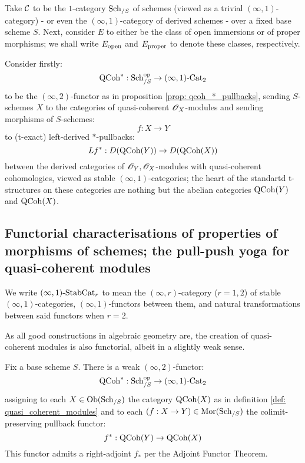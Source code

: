         \begin{example}
            Take $\mathcal{C}$ to be the $1$-category $\mathrm{Sch}_{/S}$ of schemes (viewed as a trivial $(\infty, 1)$-category) - or even the $(\infty, 1)$-category of derived schemes - over a fixed base scheme $S$. Next, consider $E$ to either be the class of open immersions or of proper morphisms; we shall write $E_{\mathrm{open}}$ and $E_{\mathrm{proper}}$ to denote these classes, respectively.

            Consider firstly:
                $$\mathrm{QCoh}^*: \mathrm{Sch}_{/S}^{\mathrm{op}} \to (\infty, 1)\text{-}\mathrm{Cat}_2$$
            to be the $(\infty, 2)$-functor as in proposition \ref{prop: qcoh_*_pullbacks}, sending $S$-schemes $X$ to the categories of quasi-coherent $\mathscr{O}_X$-modules and sending morphisms of $S$-schemes:
                $$f: X \to Y$$
            to (t-exact) left-derived $*$-pullbacks:
                $$Lf^*: D(\mathrm{QCoh}(Y)) \to D(\mathrm{QCoh}(X))$$
            between the derived categories of $\mathscr{O}_Y, \mathscr{O}_X$-modules with quasi-coherent cohomologies, viewed as stable $(\infty, 1)$-categories; the heart of the standartd t-structures on these categories are nothing but the abelian categories $\mathrm{QCoh}(Y)$ and $\mathrm{QCoh}(X)$. 
        \end{example}

    \subsection{Functorial characterisations of properties of morphisms of schemes; the pull-push yoga for quasi-coherent modules}
        \begin{convention}
            We write $(\infty, 1)\text{-}\mathrm{Stab}\mathrm{Cat}_r$ to mean the $(\infty, r)$-category ($r = 1, 2$) of stable $(\infty, 1)$-categories, $(\infty, 1)$-functors between them, and natural transformations between said functors when $r = 2$.
        \end{convention}
    
        As all good constructions in algebraic geometry are, the creation of quasi-coherent modules is also functorial, albeit in a slightly weak sense. 
        \begin{proposition} \label{prop: qcoh_*_pullbacks}
            Fix a base scheme $S$. There is a weak $(\infty, 2)$-functor:
                $$\mathrm{QCoh}^*: \mathrm{Sch}_{/S}^{\mathrm{op}} \to (\infty, 1)\text{-}\mathrm{Cat}_2$$
            assigning to each $X \in \mathrm{Ob}(\mathrm{Sch}_{/S})$ the category $\mathrm{QCoh}(X)$ as in definition \ref{def: quasi_coherent_modules} and to each $(f: X \to Y) \in \mathrm{Mor}(\mathrm{Sch}_{/S})$ the colimit-preserving pullback functor:
                $$f^*: \mathrm{QCoh}(Y) \to \mathrm{QCoh}(X)$$
            This functor admits a right-adjoint $f_*$ per the Adjoint Functor Theorem. 
        \end{proposition}

